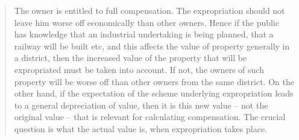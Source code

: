 \begin{quote}
The owner is entitled to full compensation. The expropriation should not leave him worse off economically than other owners. Hence if the public has knowledge that an industrial undertaking is being planned, that a railway will be built etc, and this affects the value of property generally in a district, then the increased value of the property that will be expropriated must be taken into account. If not, the owners of such property will be worse off than other owners from the same district. On the other hand, if the expectation of the scheme underlying expropriation leads to a general depreciation of value, then it is this new value -- not the original value -- that is relevant for calculating compensation. The crucial question is what the actual value is, when expropriation takes place.
\end{quote}


